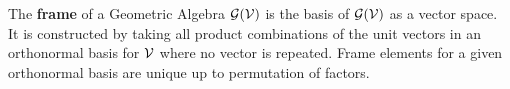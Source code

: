 \begin{definition}[Frame]
	The \textbf{frame} of a Geometric Algebra $\mathcal{G}(\mathcal{V})$ is the basis of $\mathcal{G}(\mathcal{V})$ as a vector space. It is constructed by taking all product combinations of the unit vectors in an orthonormal basis for $\mathcal{V}$ where no vector is repeated. Frame elements for a given orthonormal basis are unique up to permutation of factors.
\end{definition}
